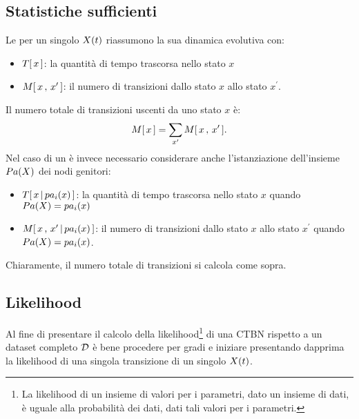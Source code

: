 \subsection{Statistiche sufficienti}
\label{sec:ctbn-sufficient-stats}
Le \emph{\stats{}} per un singolo \mprocess*{} \omog*{} $\mathnormal{X}(t)$ riassumono la sua dinamica evolutiva con:
\begin{itemize}
    \item $T[\,x\,]$: la quantità di tempo trascorsa nello stato $x$
    \item $\mstat[x]{x^\prime}$: il numero di transizioni dallo stato $x$ allo stato $x^\prime$.
\end{itemize}

Il numero totale di transizioni uscenti da uno stato $x$ è:
\[
\mstat{x}=\sum_{x^\prime}\mstat[x]{x^\prime}\text{.}
\]
Nel caso di un \mprocess*{} \cond*{} è invece necessario considerare anche l'istanziazione dell'insieme $Pa(\mathnormal{X})$ dei nodi genitori:
\begin{itemize}
    \item $T[\,x\,\arrowvert\,pa_i(\mathnormal{x})\,]$: la quantità di tempo trascorsa nello stato $x$ quando $Pa(\mathnormal{X})=pa_i(\mathnormal{x})$
    \item $\mstat[x]{x^\prime\,\arrowvert\,pa_i(\setel{x})}$: il numero di transizioni dallo stato $x$ allo stato $x^\prime$ quando $Pa(\mathnormal{X})=pa_i(\mathnormal{x})$.
\end{itemize}
Chiaramente, il numero totale di transizioni si calcola come sopra.

\subsection{Likelihood}
\label{sec:ctbn-likelihood}
Al fine di presentare il calcolo della likelihood\footnote{La likelihood di un insieme di valori per i parametri, dato un insieme di dati, è uguale alla probabilità dei dati, dati tali valori per i parametri.} di una \acs{CTBN} rispetto a un dataset completo $\mathcal{D}$ è bene procedere per gradi e iniziare presentando dapprima la likelihood di una singola transizione di un singolo \mprocess*{} \omog*{} $\mathnormal{X}(t)$.

